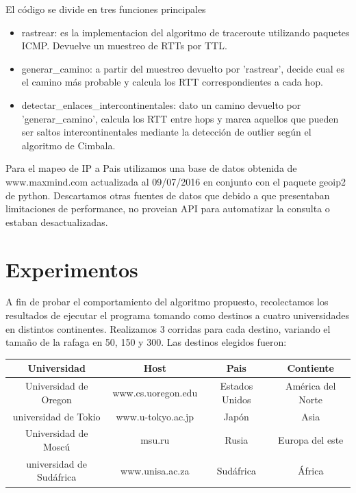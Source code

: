 El código se divide en tres funciones principales
\begin{itemize}
	\item{rastrear: es la implementacion del algoritmo de traceroute utilizando paquetes ICMP. Devuelve un muestreo de RTTs por TTL.}
	\item{generar\_camino: a partir del muestreo devuelto por 'rastrear', decide cual es el camino más probable y calcula los RTT correspondientes a cada hop.}
	\item{detectar\_enlaces\_intercontinentales: dato un camino devuelto por 'generar\_camino', calcula los RTT entre hops y marca aquellos que pueden ser saltos intercontinentales mediante la detección de outlier según el algoritmo de Cimbala.}
\end{itemize}	

Para el mapeo de IP a Pais utilizamos una base de datos obtenida de www.maxmind.com actualizada al 09/07/2016 en conjunto con el paquete geoip2 de python. Descartamos otras fuentes de datos que debido a que presentaban limitaciones de performance, no proveian API para automatizar la consulta o estaban desactualizadas. 


\section{Experimentos}
A fin de probar el comportamiento del algoritmo propuesto, recolectamos los resultados de ejecutar el programa tomando como destinos a cuatro universidades en distintos continentes. Realizamos 3 corridas para cada destino, variando el tamaño de la rafaga en 50, 150 y 300.
Las destinos elegidos fueron:

\begin{center}
   \begin{tabular}{ | c | c | c | c | }
     \hline
     \textbf{Universidad} & \textbf{Host} & \textbf{Pais} & \textbf{Contiente} \\ \hline
     Universidad de Oregon & www.cs.uoregon.edu & Estados Unidos & América del Norte\\ \hline
     universidad de Tokio & www.u-tokyo.ac.jp& Japón & Asia\\ \hline
     Universidad de Moscú & msu.ru & Rusia & Europa del este\\ \hline
     universidad de Sudáfrica & www.unisa.ac.za & Sudáfrica & África \\ \hline
   \end{tabular}
 \end{center}
 
